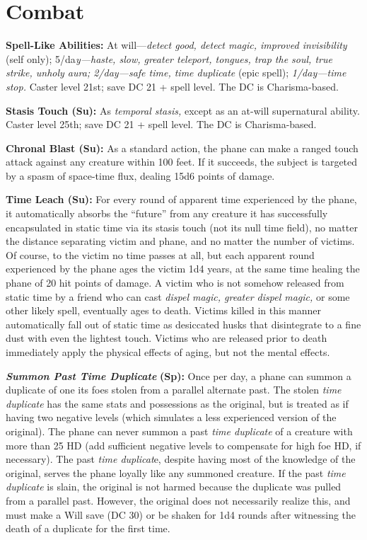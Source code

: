 \documentclass{article}
\begin{document}
\section*{Combat}

\textbf{Spell-Like Abilities:} At will---\textit{detect good, detect magic, improved 
invisibility }(self only); 5/da\textit{y---haste, slow, greater teleport, tongues, 
trap the soul, true strike, unholy aura; 2/day---safe time, time duplicate }(epic 
spell); \textit{1/day---time stop. }Caster level 21st; save DC 21 + spell level. 
The DC is Charisma-based.

\textbf{Stasis Touch (Su): }As \textit{temporal stasis, }except as an at-will supernatural 
ability. Caster level 25th; save DC 21 + spell level. The DC is Charisma-based.

\textbf{Chronal Blast (Su): }As a standard action, the phane can make a ranged 
touch attack against any creature within 100 feet. If it succeeds, the subject 
is targeted by a spasm of space-time flux, dealing 15d6 points of damage. 

\textbf{Time Leach (Su):} For every round of apparent time experienced by the phane, 
it automatically absorbs the ``future'' from any creature it has successfully encapsulated 
in static time via its stasis touch (not its null time field), no matter the distance 
separating victim and phane, and no matter the number of victims. Of course, to 
the victim no time passes at all, but each apparent round experienced by the phane 
ages the victim 1d4 years, at the same time healing the phane of 20 hit points 
of damage. A victim who is not somehow released from static time by a friend who 
can cast \textit{dispel magic, greater dispel magic, }or some other likely spell, 
eventually ages to death. Victims killed in this manner automatically fall out 
of static time as desiccated husks that disintegrate to a fine dust with even the 
lightest touch. Victims who are released prior to death immediately apply the physical 
effects of aging, but not the mental effects. 

\textit{\textbf{Summon Past Time Duplicate }}\textbf{(Sp):} Once per day, a phane 
can summon a duplicate of one its foes stolen from a parallel alternate past. The 
stolen \textit{time duplicate }has the same stats and possessions as the original, 
but is treated as if having two negative levels (which simulates a less experienced 
version of the original). The phane can never summon a past \textit{time duplicate 
}of a creature with more than 25 HD (add sufficient negative levels to compensate 
for high foe HD, if necessary). The past \textit{time duplicat}e, despite having 
most of the knowledge of the original, serves the phane loyally like any summoned 
creature. If the past \textit{time duplicate }is slain, the original is not harmed 
because the duplicate was pulled from a parallel past. However, the original does 
not necessarily realize this, and must make a Will save (DC 30) or be shaken for 
1d4 rounds after witnessing the death of a duplicate for the first time. 
\end{document}
